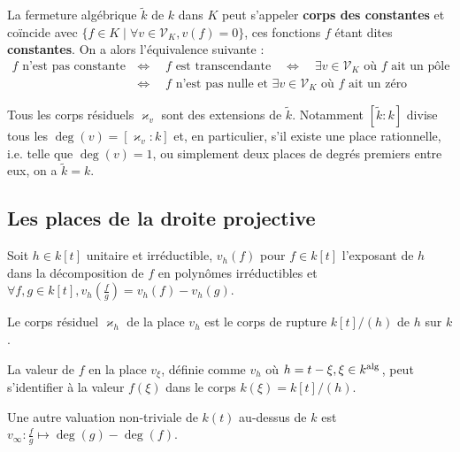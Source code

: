 	\begin{pop}
		La fermeture algébrique $\tilde{k}$ de $k$ dans $K$ peut s'appeler \textbf{corps des constantes} et coïncide avec $\{ f \in K \mid \forall v \in \mathscr{V}_K, v(f) = 0 \}$, ces fonctions $f$ étant dites \textbf{constantes}.
		On a alors l'équivalence suivante :
		\begin{align*}
		\text{$f$ n'est pas constante} & \iff \quad \text{$f$ est transcendante} \quad \iff \quad \text{$\exists v \in \mathscr{V}_K$ où $f$ ait un pôle} \\
		                               & \iff \quad \text{$f$ n'est pas nulle et $\exists v \in \mathscr{V}_K$ où $f$ ait un zéro}
		\end{align*}
	\end{pop}
	
	\begin{rem}
		Tous les corps résiduels $\varkappa_v$ sont des extensions de $\tilde{k}$.
		Notamment $[\tilde{k} : k]$ divise tous les $\deg(v) = [\varkappa_v : k]$ et, en particulier, s'il existe une place rationnelle, i.e. telle que $\deg(v) = 1$, ou simplement deux places de degrés premiers entre eux, on a $\tilde{k} = k$.
	\end{rem}

\subsection{Les places de la droite projective}

	Soit $h \in k[t]$ unitaire et irréductible, $v_h(f)$ pour $f \in k[t]$ l'exposant de $h$ dans la décomposition de $f$ en polynômes irréductibles et $\forall f,g \in k[t], v_h \left( \frac{f}{g} \right) = v_h(f) - v_h(g)$.

	\begin{pop}
		Le corps résiduel $\varkappa_h$ de la place $v_h$ est le corps de rupture $k[t] / (h)$ de $h$ sur $k$.
	\end{pop}

	\begin{rem}
		La valeur de $f$ en la place $v_\xi$, définie comme $v_h$ où $h = t - \xi, \xi \in k^{\operatorname{alg}{}}$, peut s'identifier à la valeur $f(\xi)$ dans le corps $k(\xi) = k[t] / (h)$.
	\end{rem}
	
	\begin{rem}
		Une autre valuation non-triviale de $k(t)$ au-dessus de $k$ est $v_\infty \colon \frac{f}{g} \mapsto \deg(g) - \deg(f)$.
	\end{rem}
	

